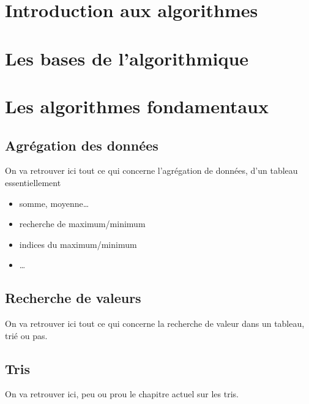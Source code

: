 \documentclass[a4paper,doubleside]{book}
\begin{document}

	
	
	

	\part{Introduction aux algorithmes}	
		
		
		

	\part{Les bases de l'algorithmique}
		
		
		
		
		
		

	\part{Les algorithmes fondamentaux}
		\chapter{Agrégation des données}
			\begin{Note}
			On va retrouver ici tout ce qui concerne l'agrégation
			de données, d'un tableau essentiellement
			\begin{itemize}
			\item somme, moyenne\dots
			\item recherche de maximum/minimum
			\item indices du maximum/minimum
			\item \dots
			\end{itemize}
			\end{Note}
		\chapter{Recherche de valeurs}
			\begin{Note}
			On va retrouver ici tout ce qui concerne la recherche
			de valeur dans un tableau, trié ou pas.
			\end{Note}
		\chapter{Tris}
			\begin{Note}
			On va retrouver ici,
			peu ou prou le chapitre actuel sur les tris.
			\end{Note}
\end{document}
